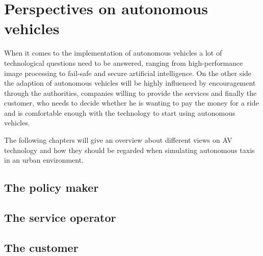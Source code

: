 \chapter{Perspectives on autonomous vehicles}

When it comes to the implementation of autonomous vehicles a lot of technological
questions need to be answered, ranging from high-performance image processing
to fail-safe and secure artificial intelligence. On the other side the adaption
of autonomous vehicles will be highly influenced by encouragement through the
authorities, companies willing to provide the services and finally the customer,
who needs to decide whether he is wanting to pay the money for a ride and is
comfortable enough with the technology to start using autonomous vehicles.

The following chapters will give an overview about different views on AV technology
and how they should be regarded when simulating autonomous taxis in an urban
environment.

\section{The policy maker}

\section{The service operator}

\section{The customer}
